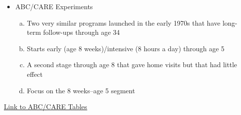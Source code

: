 \documentclass[static]{JJH-Beamer}
\begin{document}
\begin{frame}

\begin{itemize}
\item ABC/CARE Experiments
    \begin{enumerate}[(a)]
    \item Two very similar programs launched in the early 1970s that have long-term follow-ups through age 34
    \item Starts early (age 8 weeks)/intensive (8 hours a day) through age 5
    \item A second stage through age 8 that gave home visits but that had little effect
    \item Focus on the 8 weeks--age 5 segment
    \end{enumerate}
\end{itemize}

\hypertarget{ret:pancakeswaffles}{}
\begin{center}
\hyperlink{pancakeswaffles}{\underline{Link to ABC/CARE Tables}}
\end{center}

\end{frame}


\end{document}
